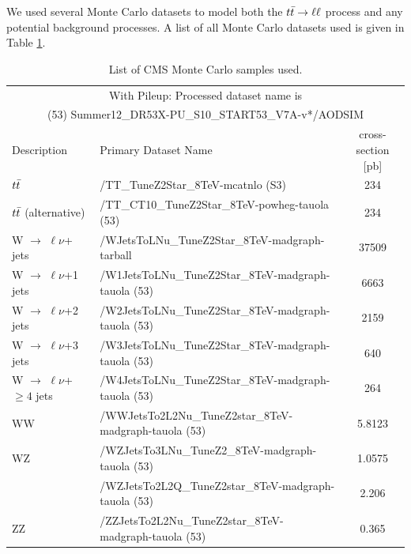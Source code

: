 We used several Monte Carlo datasets to model both the $t\bar{t} \rightarrow \ell\ell$
process and any potential background processes. A list of all Monte
Carlo datasets used is given in Table \ref{tab:afb:mcsamples}.

\begin{table}[pht]
\begin{center}
\caption{List of CMS Monte Carlo samples used.}
\label{tab:afb:mcsamples}
{\footnotesize
\begin{tabular}{l|l|c}
\hline
\multicolumn{3}{c}{With Pileup: Processed dataset name is} \\
\multicolumn{3}{c}{(53) Summer12\_DR53X-PU\_S10\_START53\_V7A-v*/AODSIM} \\
\hline
 Description                     &   Primary Dataset Name   & cross-section [pb]\\
\hline
$t\bar{t}$                                                     &   /TT\_TuneZ2Star\_8TeV-mcatnlo (S3)                            & 234 \\
$t\bar{t}$ (alternative)                                           &   /TT\_CT10\_TuneZ2Star\_8TeV-powheg-tauola (53)           & 234 \\
W $\rightarrow$ $\ell\nu$+ jets                &   /WJetsToLNu\_TuneZ2Star\_8TeV-madgraph-tarball                             & 37509\\
W $\rightarrow$ $\ell\nu$+1 jets               &   /W1JetsToLNu\_TuneZ2Star\_8TeV-madgraph-tauola (53)                        &  6663  \\
W $\rightarrow$ $\ell\nu$+2 jets               &   /W2JetsToLNu\_TuneZ2Star\_8TeV-madgraph-tauola (53)                        &  2159 \\
W $\rightarrow$ $\ell\nu$+3 jets               &   /W3JetsToLNu\_TuneZ2Star\_8TeV-madgraph-tauola (53)                        &   640 \\
W $\rightarrow$ $\ell\nu$+$\geq 4$ jets        &   /W4JetsToLNu\_TuneZ2Star\_8TeV-madgraph-tauola (53)                        &   264 \\
WW      & /WWJetsTo2L2Nu\_TuneZ2star\_8TeV-madgraph-tauola (53) &   5.8123\\
WZ      & /WZJetsTo3LNu\_TuneZ2\_8TeV-madgraph-tauola (53)              &   1.0575\\
        & /WZJetsTo2L2Q\_TuneZ2star\_8TeV-madgraph-tauola (53)          &   2.206\\
ZZ      & /ZZJetsTo2L2Nu\_TuneZ2star\_8TeV-madgraph-tauola (53)         &   0.365\\

\end{tabular}}
\end{center}
\end{table}
